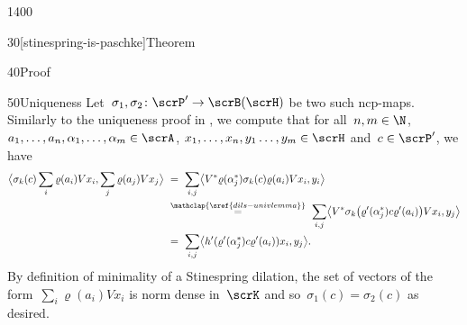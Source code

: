 \begin{parsec}{1400}
\begin{point}{30}[stinespring-is-paschke]{Theorem}
\begin{point}{40}{Proof}
\spacingfix{}
\begin{point}{50}{Uniqueness}%
    Let~$\sigma_1,\sigma_2\colon \scrP' \to \scrB(\scrH)$
        be two such ncp-maps.
    Similarly to the uniqueness proof in ,
    we compute
        that for all~$n,m \in \N$,
        $a_1, \ldots, a_n,\alpha_1, \ldots, \alpha_m \in \scrA$,
        $x_1, \ldots, x_n,y_1 \ldots, y_m \in \scrH$
        and~$c \in \scrP'$, we have
\begin{align*}
    \bigl< \sigma_k(c)
        \sum_i \varrho(a_i) V x_i,
        \sum_j \varrho(a_j) V x_j \bigr>
    &\ = \ \sum_{i,j}
        \bigl< V^* \varrho(\alpha_j^*) \sigma_k(c) \varrho(a_i) V x_i, y_i
            \bigr> \\
            & \ \stackrel{\mathclap{\sref{dils-univlemma}}}{=} \ \sum_{i,j}
        \bigl< V^* \sigma_k \bigl(\varrho'(\alpha_j^*) c
            \varrho'(a_i)\bigr) V x_i, y_j\bigr> \\
    & \ =\  \sum_{i,j}
            \bigl< h'(\varrho'(\alpha_j^*) c \varrho'(a_i) )x_i, y_j
            \bigr>.
\end{align*}
By definition of minimality of a Stinespring dilation,
the set of vectors of the form~$\sum_i \varrho(a_i) Vx_i$
    is norm dense in~$\scrK$
    and so~$\sigma_1(c)=\sigma_2(c)$ as desired.
\end{point}

\spacingfix{}


\end{point}
\end{point}
\end{parsec}
